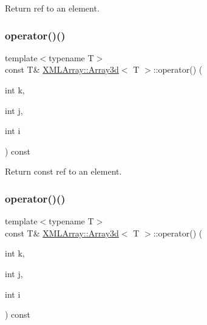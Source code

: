 Return ref to an element. 

\mbox{\label{classXMLArray_1_1Array3d_a177102edcf9ac47e8dbf50311d9e5549}} 
\subsubsection{\texorpdfstring{operator()()}{operator()()}\hspace{0.1cm}{\footnotesize\ttfamily [4/6]}}
{\footnotesize\ttfamily template$<$typename T$>$ \\
const T\& \mbox{\hyperlink{classXMLArray_1_1Array3d}{X\+M\+L\+Array\+::\+Array3d}}$<$ T $>$\+::operator() (\begin{DoxyParamCaption}\item[{int}]{k,  }\item[{int}]{j,  }\item[{int}]{i }\end{DoxyParamCaption}) const\hspace{0.3cm}{\ttfamily [inline]}}



Return const ref to an element. 

\mbox{\label{classXMLArray_1_1Array3d_a177102edcf9ac47e8dbf50311d9e5549}} 
\subsubsection{\texorpdfstring{operator()()}{operator()()}\hspace{0.1cm}{\footnotesize\ttfamily [5/6]}}
{\footnotesize\ttfamily template$<$typename T$>$ \\
const T\& \mbox{\hyperlink{classXMLArray_1_1Array3d}{X\+M\+L\+Array\+::\+Array3d}}$<$ T $>$\+::operator() (\begin{DoxyParamCaption}\item[{int}]{k,  }\item[{int}]{j,  }\item[{int}]{i }\end{DoxyParamCaption}) const\hspace{0.3cm}{\ttfamily [inline]}}




